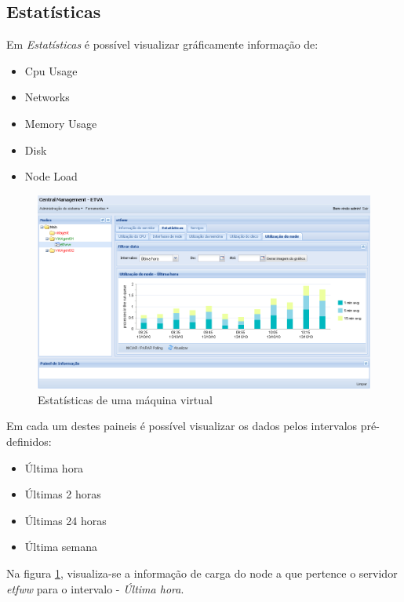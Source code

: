 \subsection{Estatísticas}
Em \emph{Estatísticas} é possível visualizar gráficamente informação de:
\begin{itemize}
	\item Cpu Usage
	\item Networks
	\item Memory Usage
	\item Disk
	\item Node Load
\end{itemize}


\begin{figure}[H]
	\begin{center}
	\includegraphics[scale=0.45]{screenshots/server_stats_nodeLoad.png}
	\caption{Estatísticas de uma máquina virtual}
	\label{fig:server_stats_nodeLoad}
	\end{center}
\end{figure}

Em cada um destes paineis é possível visualizar os dados pelos intervalos pré-definidos:
\begin{itemize}
	\item Última hora
	\item Últimas 2 horas
	\item Últimas 24 horas
	\item Última semana
\end{itemize}

Na figura \ref{fig:server_stats_nodeLoad}, visualiza-se a informação de carga do node a que pertence o servidor \emph{etfww} para o intervalo - \emph{Última hora}.

